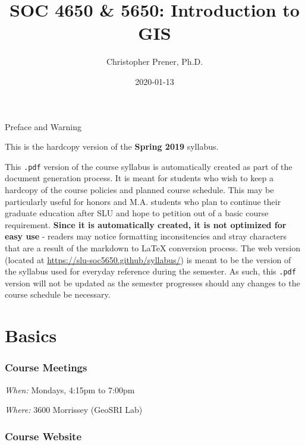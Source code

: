\documentclass[
]{book}
\title{SOC 4650 \& 5650: Introduction to GIS}
\author{Christopher Prener, Ph.D.}
\date{2020-01-13}
\begin{document}
\maketitle

\begin{center}
{\huge Preface and Warning} \\
\end{center}
\vspace{5mm}
This is the hardcopy version of the \textbf{Spring 2019} syllabus.
\vspace{5mm}
\par \noindent This \texttt{.pdf} version of the course syllabus is automatically created as part of the document generation process. It is meant for students who wish to keep a hardcopy of the course policies and planned course schedule. This may be particularly useful for honors and M.A. students who plan to continue their graduate education after SLU and hope to petition out of a basic course requirement. \textbf{Since it is automatically created, it is not optimized for easy use} - readers may notice formatting inconsitencies and stray characters that are a result of the markdown to \LaTeX{} conversion process. The web version (located at \href{https://slu-soc5650.github/syllabus/}{https://slu-soc5650.github/syllabus/}) is meant to be the version of the syllabus used for everyday reference during the semester. As such, this \texttt{.pdf} version will not be updated as the semester progresses should any changes to the course schedule be necessary.

\hypertarget{basics}{%
\chapter*{Basics}\label{basics}}

\hypertarget{course-meetings}{%
\subsection*{Course Meetings}\label{course-meetings}}

\emph{When:} Mondays, 4:15pm to 7:00pm

\emph{Where:} 3600 Morrissey (GeoSRI Lab)

\hypertarget{course-website}{%
\subsection*{Course Website}\label{course-website}}
\end{document}
